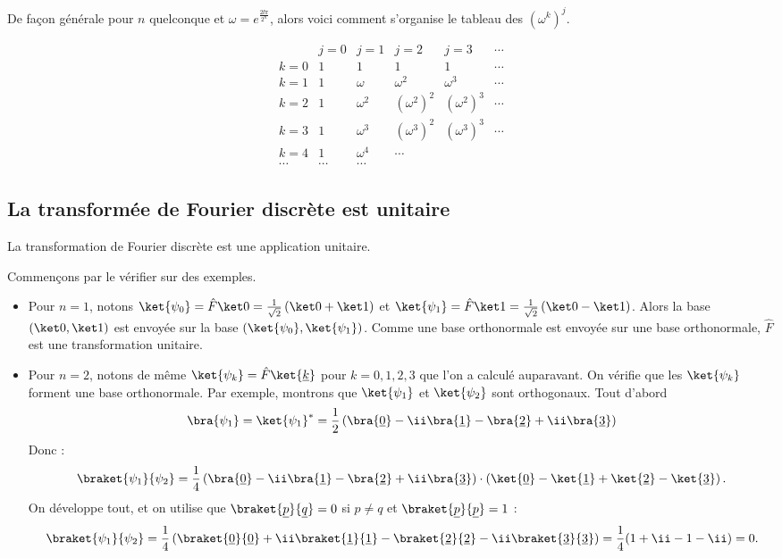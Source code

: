 \documentclass[11pt,class=report,crop=false]{standalone}
\begin{document}
De façon générale pour $n$ quelconque et $\omega = e^{\frac{2\ii\pi}{2^n}}$, alors voici comment s'organise le tableau des $(\omega^k)^j$.
\begin{center}
$$
\begin{array}{c|ccccc}
      & j=0 & j=1 & j=2 & j=3 & \cdots \\ \hline
k = 0 & 1 & 1 & 1 & 1 & \cdots \\
k = 1 & 1 & \omega & \omega^2 & \omega^3 & \cdots \\
k = 2 & 1 & \omega^2 & (\omega^2)^2 & (\omega^2)^3 & \cdots \\
k = 3 & 1 & \omega^3 & (\omega^3)^2 & (\omega^3)^3 & \cdots \\
k = 4 & 1 & \omega^4 &\cdots & &  \\
\cdots & \cdots & \cdots & & &
\end{array}
$$
\end{center}


\subsection{La transformée de Fourier discrète est unitaire}

\begin{proposition}
La transformation de Fourier discrète est une application unitaire.
\end{proposition}

Commençons par le vérifier sur des exemples.
\begin{itemize}
  \item Pour $n=1$, notons $\ket{\psi_0} = \hat F\ket0=\frac{1}{\sqrt2} \left(\ket0 + \ket1\right)$ et $\ket{\psi_1} = \hat F\ket1=\frac{1}{\sqrt2} \left(\ket0 - \ket1\right)$.
Alors la base $(\ket0,\ket1)$ est envoyée sur la base $(\ket{\psi_0},\ket{\psi_1})$.
Comme une base orthonormale est envoyée sur une base orthonormale, $\hat F$ est une transformation unitaire.

  \item Pour $n=2$, notons de même $\ket{\psi_k} = \hat F \ket{\underline k}$ pour $k=0,1,2,3$ que l'on a calculé auparavant. On vérifie que les $\ket{\psi_k}$ forment une base orthonormale.
  Par exemple, montrons que $\ket{\psi_1}$ et $\ket{\psi_2}$ sont orthogonaux.
Tout d'abord 
$$\bra{\psi_1} = \ket{\psi_1}^* = 
\frac12 \left(\bra{\underline0} - \ii\bra{\underline1} - \bra{\underline2} +\ii \bra{\underline3}\right)
$$
Donc : 
  $$
  \braket{\psi_1}{\psi_2}
     = \frac14
\left(\bra{\underline0} - \ii\bra{\underline1} - \bra{\underline2} +\ii \bra{\underline3}\right) \cdot 
\left(\ket{\underline0} - \ket{\underline1} + \ket{\underline2} - \ket{\underline3}\right).$$
 On développe tout, et on utilise que $\braket{\underline p}{\underline q} = 0$ si $p\neq q$ et
$\braket{\underline p}{\underline p} = 1$ :
$$
  \braket{\psi_1}{\psi_2} = \frac14 \left( 
      \braket{\underline 0}{\underline 0}
+\ii \braket{\underline 1}{\underline 1}
-    \braket{\underline 2}{\underline 2}
-\ii\braket{\underline 3}{\underline 3}\right)
= \frac14 (1+\ii -1-\ii)
= 0.$$
\end{itemize}
\end{document}
